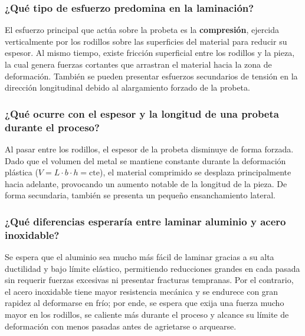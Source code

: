 \documentclass[journal]{IEEEtran}
\begin{document}
\subsubsection{¿Qué tipo de esfuerzo predomina en la laminación?}
El esfuerzo principal que actúa sobre la probeta es la \textbf{compresión}, ejercida verticalmente por los rodillos sobre las superficies del material para reducir su espesor. Al mismo tiempo, existe fricción superficial entre los rodillos y la pieza, la cual genera fuerzas cortantes que arrastran el material hacia la zona de deformación. También se pueden presentar esfuerzos secundarios de tensión en la dirección longitudinal debido al alargamiento forzado de la probeta.

\subsubsection{¿Qué ocurre con el espesor y la longitud de una probeta durante el proceso?}
Al pasar entre los rodillos, el espesor de la probeta disminuye de forma forzada. Dado que el volumen del metal se mantiene constante durante la deformación plástica ($V = L \cdot b \cdot h = \text{cte}$), el material comprimido se desplaza principalmente hacia adelante, provocando un aumento notable de la longitud de la pieza. De forma secundaria, también se presenta un pequeño ensanchamiento lateral.

\subsubsection{¿Qué diferencias esperaría entre laminar aluminio y acero inoxidable?}
Se espera que el aluminio sea mucho más fácil de laminar gracias a su alta ductilidad y bajo límite elástico, permitiendo reducciones grandes en cada pasada sin requerir fuerzas excesivas ni presentar fracturas tempranas. Por el contrario, el acero inoxidable tiene mayor resistencia mecánica y se endurece con gran rapidez al deformarse en frío; por ende, se espera que exija una fuerza mucho mayor en los rodillos, se caliente más durante el proceso y alcance su límite de deformación con menos pasadas antes de agrietarse o arquearse.
\end{document}
